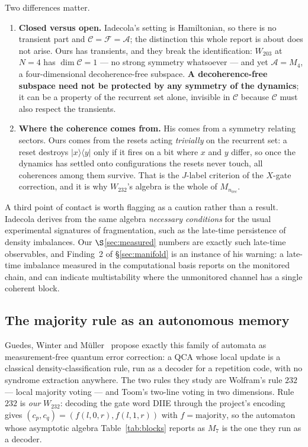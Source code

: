 \documentclass[11pt]{article}
\theoremstyle{plain}
\theoremstyle{definition}
\theoremstyle{remark}
\begin{document}
Two differences matter.

\begin{enumerate}
\item \textbf{Closed versus open.} Iadecola's setting is Hamiltonian, so there
is no transient part and $\mathcal{C} = \mathcal{F} = \mathcal{A}$; the
distinction this whole report is about does not arise. Ours has transients, and
they break the identification: $W_{203}$ at $N = 4$ has $\dim\mathcal{C} = 1$
--- no strong symmetry whatsoever --- and yet $\mathcal{A} = M_4$, a
four-dimensional decoherence-free subspace. \textbf{A decoherence-free subspace
need not be protected by any symmetry of the dynamics}; it can be a property of
the recurrent set alone, invisible in $\mathcal{C}$ because $\mathcal{C}$ must
also respect the transients.
\item \textbf{Where the coherence comes from.} His comes from a symmetry
relating sectors. Ours comes from the resets acting \emph{trivially} on the
recurrent set: a reset destroys $|x\rangle\langle y|$ only if it fires on a bit
where $x$ and $y$ differ, so once the dynamics has settled onto configurations
the resets never touch, all coherences among them survive. That is the $J$-label
criterion of the $X$-gate correction, and it is why $W_{232}$'s algebra is the
whole of $M_{n_{\mathrm{rec}}}$.
\end{enumerate}

A third point of contact is worth flagging as a caution rather than a result.
Iadecola derives from the same algebra \emph{necessary conditions} for the usual
experimental signatures of fragmentation, such as the late-time persistence of
density imbalances. Our $\S$\ref{sec:measured} numbers are exactly such
late-time observables, and Finding~2 of \S\ref{sec:manifold} is an instance of
his warning: a late-time imbalance measured in the computational basis reports
on the monitored chain, and can indicate multistability where the unmonitored
channel has a single coherent block.

\subsection{The majority rule as an autonomous memory}

Guedes, Winter and M\"uller~\cite{guedes2024} propose exactly this family of
automata as measurement-free quantum error correction: a QCA whose local update
is a classical density-classification rule, run as a decoder for a repetition
code, with no syndrome extraction anywhere. The two rules they study are
Wolfram's rule $232$ --- local majority voting --- and Toom's two-line voting in
two dimensions. Rule $232$ is \emph{our} $W_{232}$: decoding the gate word DIIE
through the project's encoding gives $(c_p,c_q) = (f(l,0,r), f(l,1,r))$ with
$f = \mathrm{majority}$, so the automaton whose asymptotic algebra
Table~\ref{tab:blocks} reports as $M_7$ is the one they run as a decoder.
\end{document}
